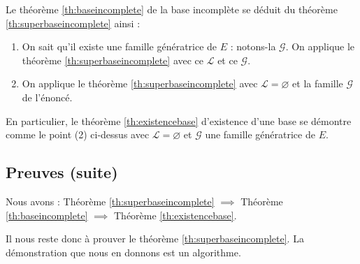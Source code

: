 \documentclass[class=report,crop=false]{standalone}
\begin{document}
Le théorème \ref{th:baseincomplete} de la base incomplète se déduit du
théorème \ref{th:superbaseincomplete} ainsi :
\begin{enumerate}
  \item On sait qu'il existe une famille génératrice de $E$ : notons-la $\mathcal{G}$.
  On applique le théorème \ref{th:superbaseincomplete} avec ce $\mathcal{L}$ et ce $\mathcal{G}$.

  \item On applique le théorème \ref{th:superbaseincomplete} avec $\mathcal{L}=\varnothing$
  et la famille $\mathcal{G}$ de l'énoncé.
\end{enumerate}

En particulier, le théorème \ref{th:existencebase} d'existence d'une base
se démontre comme le point (2) ci-dessus avec $\mathcal{L}=\varnothing$
  et  $\mathcal{G}$ une famille génératrice de $E$.

\subsection{Preuves (suite)}

Nous avons :
Théorème \ref{th:superbaseincomplete} $\implies$
Théorème \ref{th:baseincomplete} $\implies$
Théorème \ref{th:existencebase}.

Il nous reste donc à prouver le théorème \ref{th:superbaseincomplete}.
La démonstration que nous en donnons est un algorithme.
\end{document}
